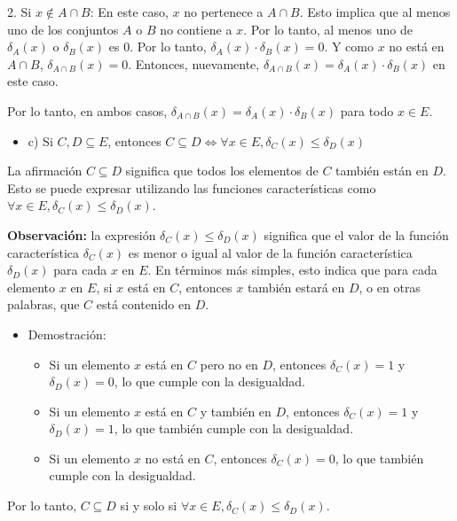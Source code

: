 \documentclass{templateNote}
\begin{document}
2. Si \(x \notin A \cap B\): En este caso, \(x\) no pertenece a \(A \cap B\). Esto implica que al menos uno de los conjuntos \(A\) o \(B\) no contiene a \(x\). Por lo tanto, al menos uno de \(\delta_A(x)\) o \(\delta_B(x)\) es 0. Por lo tanto, \(\delta_A(x) \cdot \delta_B(x) = 0\). Y como \(x\) no está en \(A \cap B\), \(\delta_{A \cap B}(x) = 0\). Entonces, nuevamente, \(\delta_{A \cap B}(x) = \delta_A(x) \cdot \delta_B(x)\) en este caso.

Por lo tanto, en ambos casos, \(\delta_{A\cap B}(x) = \delta_A(x)\cdot \delta_B(x)\) para todo \(x \in E\).

\begin{itemize}
    \item c) Si $C, D \subseteq E$, entonces $C \subseteq D \Leftrightarrow \forall x \in E, \delta_C(x) \leq \delta_D(x)$
\end{itemize}

La afirmación \(C \subseteq D\) significa que todos los elementos de \(C\) también están en \(D\). Esto se puede expresar utilizando las funciones características como \(\forall x \in E, \delta_C(x) \leq \delta_D(x)\).
\begin{tcolorbox}
    \textbf{Observación:} la expresión 
    $\delta_C(x) \leq \delta_D(x)$ significa que el valor de la función característica $\delta_C(x)$ es menor o igual al valor de la función característica $\delta_D(x)$ para cada $x$ en $E$. En términos más simples, esto indica que para cada elemento $x$ en $E$, si $x$ está en $C$, entonces $x$ también estará en $D$, o en otras palabras, que $C$ está contenido en $D$.
\end{tcolorbox}
\begin{itemize}
    \item Demostración:
    \begin{itemize}
        \item Si un elemento \(x\) está en \(C\) pero no en \(D\), entonces \(\delta_C(x) = 1\) y \(\delta_D(x) = 0\), lo que cumple con la desigualdad.
        \item Si un elemento \(x\) está en \(C\) y también en \(D\), entonces \(\delta_C(x) = 1\) y \(\delta_D(x) = 1\), lo que también cumple con la desigualdad.
        \item Si un elemento \(x\) no está en \(C\), entonces \(\delta_C(x) = 0\), lo que también cumple con la desigualdad.
    \end{itemize}
\end{itemize}

Por lo tanto, \(C \subseteq D\) si y solo si \(\forall x \in E, \delta_C(x) \leq \delta_D(x)\).
\end{document}
